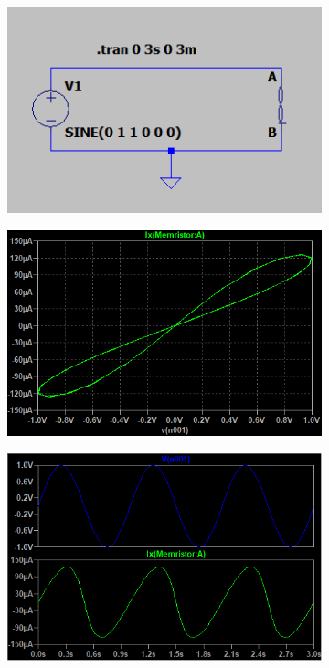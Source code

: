 \documentclass{ceel}
\begin{document}
\begin{multicols}{2}
\begin{figure}[ht]
\vspace{0.2cm}
\begin{subfigure}{0.32\textwidth}
\centering
\includegraphics[width=\columnwidth]{ltspice}
\caption{} \label{spice:project}
\end{subfigure}
\hfill
\begin{subfigure}{0.32\textwidth}
\centering
\includegraphics[width=\columnwidth]{pinched}
\caption{} \label{spice:pinched}
\end{subfigure}
\hfill
\begin{subfigure}{0.32\textwidth}
\centering
\includegraphics[width=\columnwidth]{vt-it}
\caption{} \label{spice:vt-it}
\end{subfigure}


\end{figure}
\end{multicols}
\end{document}
